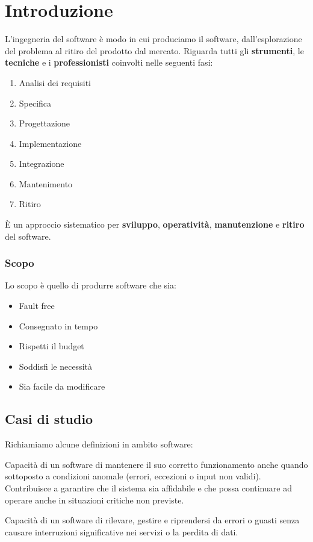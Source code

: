 \newpage
\section{Introduzione}
L'ingegneria del software è modo in cui produciamo il software, dall'esplorazione del problema al ritiro del prodotto dal mercato. Riguarda tutti gli \textbf{strumenti}, le \textbf{tecniche} e i \textbf{professionisti} coinvolti nelle seguenti fasi:
\begin{enumerate}
	\item Analisi dei requisiti
	\item Specifica
	\item Progettazione
	\item Implementazione
	\item Integrazione
	\item Mantenimento
	\item Ritiro
\end{enumerate}
\begin{definition}
	È un approccio sistematico per \textbf{sviluppo}, \textbf{operatività}, \textbf{manutenzione} e \textbf{ritiro} del software.
\end{definition}
\subsubsection{Scopo}
Lo scopo è quello di produrre software che sia:
\begin{itemize}
	\item Fault free
	\item Consegnato in tempo
	\item Rispetti il budget
	\item Soddisfi le necessità
	\item Sia facile da modificare
\end{itemize}

\subsection{Casi di studio}
Richiamiamo alcune definizioni in ambito software:
\begin{definition}[Robustezza]
	Capacità di un software di mantenere il suo corretto funzionamento anche quando sottoposto a condizioni anomale (errori, eccezioni o input non validi). Contribuisce a garantire che il sistema sia affidabile e che possa continuare ad operare anche in situazioni critiche non previste.
\end{definition}
\begin{definition}
	Capacità di un software di rilevare, gestire e riprendersi da errori o guasti senza causare interruzioni significative nei servizi o la perdita di dati.
\end{definition}
